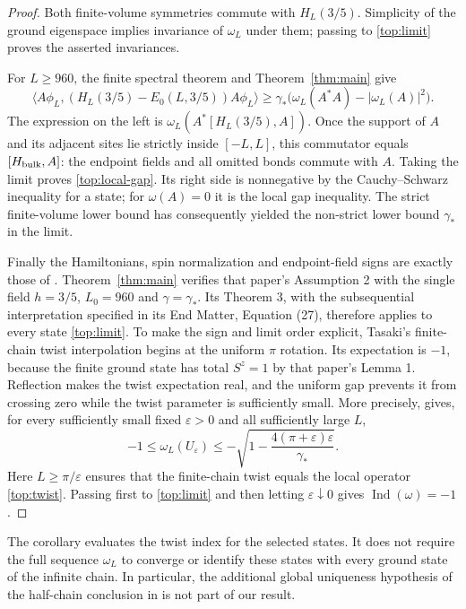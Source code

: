 \begin{proof}
Both finite-volume symmetries commute with $H_L(3/5)$. Simplicity of
the ground eigenspace implies invariance of $\omega_L$ under them;
passing to \eqref{top:limit} proves the asserted invariances.

For $L\ge960$, the finite spectral theorem and Theorem~\ref{thm:main}
give
\[
 \langle A\phi_L,(H_L(3/5)-E_0(L,3/5))A\phi_L\rangle
 \ge\gamma_*\bigl(\omega_L(A^*A)-|\omega_L(A)|^2\bigr).
\]
The expression on the left is
$\omega_L(A^*[H_L(3/5),A])$. Once the support of $A$ and its adjacent
sites lie strictly inside $[-L,L]$, this commutator equals
$[H_{\rm bulk},A]$: the endpoint fields and all omitted bonds commute
with $A$. Taking the limit proves \eqref{top:local-gap}. Its right
side is nonnegative by the Cauchy--Schwarz inequality for a state;
for $\omega(A)=0$ it is the local gap inequality. The strict
finite-volume lower bound has consequently yielded the non-strict
lower bound $\gamma_*$ in the limit.

Finally the Hamiltonians, spin normalization and endpoint-field signs
are exactly those of \cite[Equation (2)]{Tasaki2025}. Theorem~\ref{thm:main}
verifies that paper's Assumption 2 with the single field $h=3/5$,
$L_0=960$ and $\gamma=\gamma_*$. Its Theorem 3, with the subsequential
interpretation specified in its End Matter, Equation (27), therefore
applies to every state \eqref{top:limit}. To make the sign and limit
order explicit, Tasaki's finite-chain twist interpolation begins at
the uniform $\pi$ rotation. Its expectation is $-1$, because the
finite ground state has total $S^z=1$ by that paper's Lemma 1.
Reflection makes the twist expectation real, and the uniform gap
prevents it from crossing zero while the twist parameter is sufficiently
small. More precisely,
\cite[Lemmas 6--8 and Equations (17)--(18)]{Tasaki2025} gives, for
every sufficiently small fixed $\varepsilon>0$ and all sufficiently
large $L$,
\[
 -1\le\omega_L(U_\varepsilon)
 \le-\sqrt{1-\frac{4(\pi+\varepsilon)\varepsilon}{\gamma_*}}.
\]
Here $L\ge\pi/\varepsilon$ ensures that the finite-chain twist equals
the local operator \eqref{top:twist}. Passing first to
\eqref{top:limit} and then letting $\varepsilon\downarrow0$ gives
$\operatorname{Ind}(\omega)=-1$.
\end{proof}

The corollary evaluates the twist index for the selected states. It does
not require the full sequence $\omega_L$ to converge or identify these
states with every ground state of the infinite chain. In particular,
the additional global uniqueness hypothesis of the half-chain conclusion
in \cite[Corollary 4]{Tasaki2025} is not part of our result.
